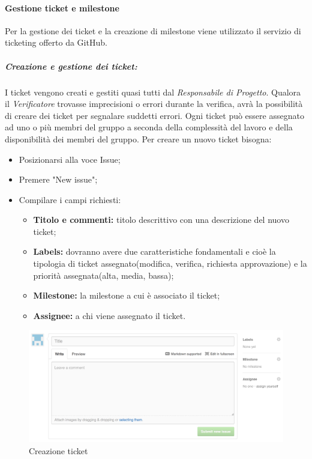 \newpage
		\paragraph{Gestione ticket e milestone} \label{ticket}
		Per la gestione dei ticket e la creazione di milestone viene utilizzato il servizio di ticketing offerto da \gls{GitHub}. 
		\subparagraph{Creazione e gestione dei ticket:} 
		
		I \gls{ticket} vengono creati e gestiti quasi tutti dal \textit{Responsabile di Progetto}.
		Qualora il \textit{Verificatore} trovasse imprecisioni o errori durante la verifica, avrà la possibilità di creare dei \gls{ticket} per segnalare suddetti errori.
		Ogni \gls{ticket} può essere assegnato ad uno o più membri del gruppo a seconda della complessità del lavoro e della disponibilità dei membri del gruppo.
		Per creare un nuovo \gls{ticket} bisogna:
		
		\begin{itemize}
			\item Posizionarsi alla voce Issue;
			\item Premere "New issue";
			\item Compilare i campi richiesti:
			\begin{itemize}
				\item \textbf{Titolo e commenti:} titolo descrittivo con una descrizione del nuovo \gls{ticket};
				\item \textbf{Labels:} dovranno avere due caratteristiche fondamentali e cioè la tipologia di \gls{ticket} assegnato(modifica, verifica, richiesta approvazione) e la priorità assegnata(alta, media, bassa);
				\item \textbf{\gls{Milestone}:} la \gls{milestone} a cui è associato il \gls{ticket};
				\item \textbf{Assignee:} a chi viene assegnato il \gls{ticket}.
			\end{itemize}
		\end{itemize}
		\begin{figure}[h]
			\centering
			\includegraphics[width=1\linewidth]{img/ticket}
			\caption[Creazione ticket]{Creazione ticket}
			\label{fig:ticket}
		\end{figure}
		
